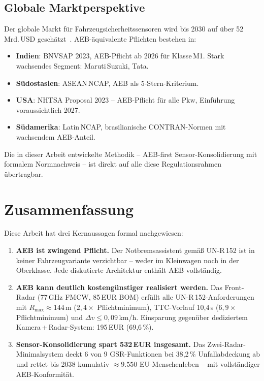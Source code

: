 ﻿\documentclass[a4paper,12pt]{article}
\theoremstyle{definition}
\begin{document}
\subsection{Globale Marktperspektive}

Der globale Markt f\"ur Fahrzeugsicherheitssensoren wird bis 2030 auf
\"uber 52\,Mrd.\,USD gesch\"atzt~\cite{marketsandmarkets2024radar}.
AEB-\"aquivalente Pflichten bestehen in:

\begin{itemize}
  \item \textbf{Indien}: BNVSAP 2023, AEB-Pflicht ab 2026 f\"ur
        Klasse\,M1. Stark wachsendes Segment: Maruti\,Suzuki, Tata.
  \item \textbf{S\"udostasien}: ASEAN\,NCAP, AEB als 5-Stern-Kriterium.
  \item \textbf{USA}: NHTSA Proposal 2023 -- AEB-Pflicht f\"ur alle
        Pkw, Einf\"uhrung voraussichtlich 2027.
  \item \textbf{S\"udamerika}: Latin\,NCAP, brasilianische CONTRAN-Normen
        mit wachsendem AEB-Anteil.
\end{itemize}

Die in dieser Arbeit entwickelte Methodik -- AEB-first Sensor-Konsolidierung
mit formalem Normnachweis -- ist direkt auf alle diese Regulationsrahmen
\"ubertragbar.

\section{Zusammenfassung}

Diese Arbeit hat drei Kernaussagen formal nachgewiesen:

\begin{enumerate}
  \item \textcolor{accentred}{\textbf{AEB ist zwingend Pflicht.}} Der
        Notbremsassistent gem\"a\ss{} UN-R\,152 ist in keiner Fahrzeugvariante
        verzichtbar -- weder im Kleinwagen noch in der Oberklasse. Jede
        diskutierte Architektur enth\"alt AEB vollst\"andig.
  \item \textbf{AEB kann deutlich kosteng\"unstiger realisiert werden.}
        Das Front-Radar (77\,GHz FMCW, 85\,EUR BOM) erf\"ullt alle
        UN-R\,152-Anforderungen mit $R_{\max}\approx144$\,m
        ($2{,}4\times$ Pflichtminimum), TTC-Vorlauf 10,4\,s
        ($6{,}9\times$ Pflichtminimum) und $\Delta v\le0{,}09$\,km/h.
        Einsparung gegen\"uber dediziertem Kamera\,+\,Radar-System:
        195\,EUR (69,6\,\%).
  \item \textbf{Sensor-Konsolidierung spart 532\,EUR insgesamt.}
        Das Zwei-Radar-Minimal\-system deckt 6 von 9 GSR-Funktionen bei
        38,2\,\% Unfallabdeckung ab und rettet bis 2038 kumulativ
        $\approx9.550$ EU-Menschenleben -- mit vollst\"andiger
        AEB-Konformit\"at.
\end{enumerate}
\end{document}
